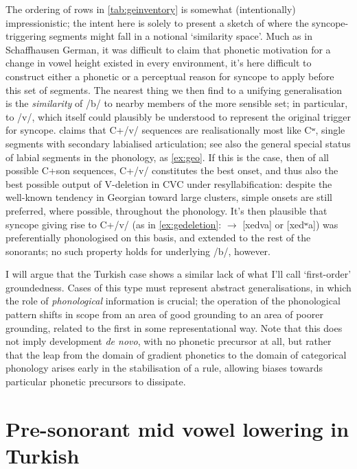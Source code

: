 The ordering of rows in \cref{tab:geinventory} is somewhat (intentionally) impressionistic; the intent here is solely to present a sketch of where the syncope-triggering segments might fall in a notional `similarity space'. Much as in Schaffhausen German, it was difficult to claim that phonetic motivation for a change in vowel height existed in every environment, it's here difficult to construct either a phonetic or a perceptual reason for syncope to apply before this set of segments. The nearest thing we then find to a unifying generalisation is the \emph{similarity} of /b/ to nearby members of the more sensible set; in particular, to /v/, which itself could plausibly be understood to represent the original trigger for syncope. \citet[p.~88]{Butskh2002} claims that C+/v/ sequences are realisationally most like Cʷ, single segments with secondary labialised articulation; see also the general special status of labial segments in the phonology, as \cref{ex:geo}. If this is the case, then of all possible C+son sequences, C+/v/ constitutes the best onset, and thus also the best possible output of V-deletion in CVC under resyllabification: despite the well-known tendency in Georgian toward large clusters, simple onsets are still preferred, where possible, throughout the phonology. It's then plausible that syncope giving rise to C+/v/ (as in \cref{ex:gedeletion}:  $\rightarrow$ [xedva] or [xedʷa]) was preferentially phonologised on this basis, and extended to the rest of the sonorants; no such property holds for underlying /b/, however.

I will argue that the Turkish case shows a similar lack of what I'll call `first-order' groundedness. Cases of this type must represent abstract generalisations, in which the role of \emph{phonological} information is crucial; the operation of the phonological pattern shifts in scope from an area of good grounding to an area of poorer grounding, related to the first in some representational way. Note that this does not imply development \emph{de novo}, with no phonetic precursor at all, but rather that the leap from the domain of gradient phonetics to the domain of categorical phonology arises early in the stabilisation of a rule, allowing biases towards particular phonetic precursors to dissipate.

\section{Pre-sonorant mid vowel lowering in Turkish}\label{s:turkishcase}

